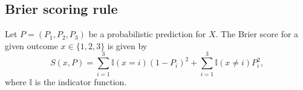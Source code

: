 \documentclass[journal,article,accept,moreauthors,pdftex,12pt,a4paper]{mdpi}
\begin{document}
	
	
	
	\subsection{Brier scoring rule}
	
	Let $P=(P_1,P_2,P_3)$ be a probabilistic prediction  for $X$.
	The Brier score for a given outcome $x\in\{1,2,3\}$ is given by
	$$S(x,P)= \sum_{i=1}^3\mathbb{I}(x=i)(1- P_i)^2+\sum_{i=1}^3\mathbb{I}(x\neq i)P^2_i,$$
	where $\mathbb{I}$ is the indicator function.
	
\end{document}
